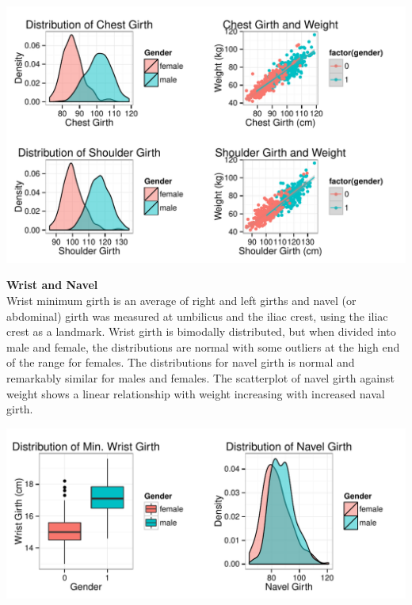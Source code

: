 \documentclass[11pt]{article}\usepackage[]{graphicx}\usepackage[]{color}
\makeatletter
\def\maxwidth{ %
  \ifdim\Gin@nat@width>\linewidth
    \linewidth
  \else
    \Gin@nat@width
  \fi
}
\newenvironment{knitrout}{}{} %
\makeatother
\begin{document}
\begin{knitrout}
\color{fgcolor}
\includegraphics[width=\maxwidth]{figure/chest_plots} 

\end{knitrout}



\newpage

\textbf{Wrist and Navel}\\ %
   
Wrist minimum girth is an average of right and left girths and navel (or abdominal) girth was measured at umbilicus and the iliac crest, using the iliac crest as a landmark. Wrist girth is bimodally distributed, but when divided into male and female, the distributions are normal with some outliers at the high end of the range for females. The distributions for navel girth is normal and remarkably similar for males and females. The scatterplot of navel girth against weight shows a linear relationship with weight increasing with increased naval girth.

\begin{knitrout}
\color{fgcolor}
\includegraphics[width=\maxwidth]{figure/navel_plots} 

\end{knitrout}
\end{document}
